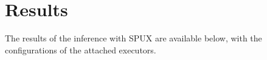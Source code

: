 \section{Results}

The results of the inference with SPUX are available below,
with the configurations of the attached executors.


